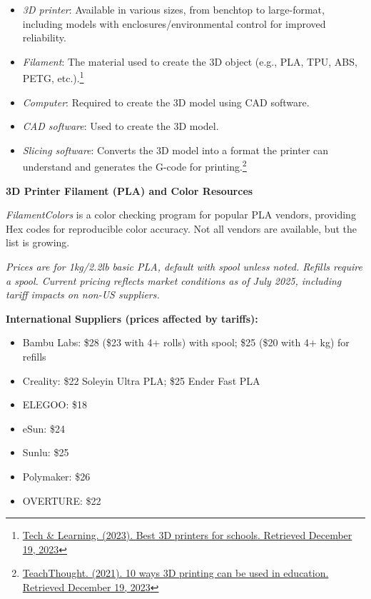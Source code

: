 \begin{itemize}
    \item \emph{3D printer}: Available in various sizes, from benchtop to large-format, including models with enclosures/environmental control for improved reliability.
    \item \emph{Filament}: The material used to create the 3D object (e.g., PLA, TPU, ABS, PETG, etc.).\footnote{\href{http://www.techlearning.com/buying-guides/best-3d-printers-for-schools}{Tech \& Learning. (2023). Best 3D printers for schools. Retrieved December 19, 2023}}
    \item \emph{Computer}: Required to create the 3D model using CAD software.
    \item \emph{CAD software}: Used to create the 3D model.
    \item \emph{Slicing software}: Converts the 3D model into a format the printer can understand and generates the G-code for printing.\footnote{\href{http://www.teachthought.com/technology/ways-3d-printing-can-be-used-in-education/}{TeachThought. (2021). 10 ways 3D printing can be used in education. Retrieved December 19, 2023}}
\end{itemize}

\textbf{3D Printer Filament (PLA) and Color Resources}

\emph{FilamentColors} is a color checking program for popular PLA vendors, providing Hex codes for reproducible color accuracy. Not all vendors are available, but the list is growing.

\textit{Prices are for 1kg/2.2lb basic PLA, default with spool unless noted. Refills require a spool. Current pricing reflects market conditions as of July 2025, including tariff impacts on non-US suppliers.}

\textbf{International Suppliers (prices affected by tariffs):}
\begin{itemize}
    \item Bambu Labs: \$28 (\$23 with 4+ rolls) with spool; \$25 (\$20 with 4+ kg) for refills
    \item Creality: \$22 Soleyin Ultra PLA; \$25 Ender Fast PLA
    \item ELEGOO: \$18
    \item eSun: \$24
    \item Sunlu: \$25
    \item Polymaker: \$26
    \item OVERTURE: \$22
\end{itemize}

